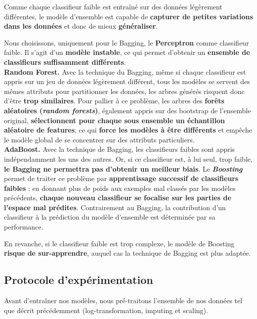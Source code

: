 \documentclass[12pt]{article}
\begin{document}
Comme chaque classifieur faible est entraîné sur des données légèrement
différentes, le modèle d'ensemble est capable de \textbf{capturer de petites
variations dans les données} et donc de mieux \textbf{généraliser}. 

Nous choisissons, uniquement pour le Bagging, le \textbf{Perceptron} comme
classifieur faible. Il s'agit d'un \textbf{modèle instable}, ce qui permet
d'obtenir un \textbf{ensemble de classifieurs suffisamment différents}. \\

\textbf{Random Forest. } \quad Avec la technique du Bagging, même si chaque classifieur
est appris sur un jeu de données légèrement différent, tous les modèles se servent des
mêmes attributs pour partitionner les données, les arbres générés
risquent donc d'être \textbf{trop similaires}. Pour pallier à ce problème, les
arbres des \textbf{forêts aléatoires (\emph{random forests})}, également appris
sur des bootstrap de l'ensemble original, \textbf{sélectionnent pour chaque sous ensemble
un échantillon aléatoire de features}, ce qui \textbf{force les modèles à être
différents} et empêche le modèle global de se concentrer sur des attributs particuliers. \\

\textbf{AdaBoost. } \quad Avec la technique de Bagging, les classifieurs faibles
sont appris indépendamment les uns des autres. Or, si ce classifieur est, à lui
seul, trop faible, \textbf{le Bagging ne permettra pas d'obtenir un meilleur
biais}. Le \textbf{\emph{Boosting}} permet de traiter ce problème par
\textbf{apprentissage successif de classifieurs faibles} : en donnant plus de
poids aux exemples mal classés par les modèles précédents, \textbf{chaque nouveau
classifieur se focalise sur les parties de l'espace mal prédites}. Contrairement
au Bagging, la contribution d'un classifieur à la prédiction du modèle
d'ensemble est déterminée par sa performance.

En revanche, si le classifieur faible est trop complexe, le modèle de Boosting
\textbf{risque de sur-apprendre}, auquel cas la technique de Bagging est plus
adaptée.\\

\subsection{Protocole d'expérimentation}


Avant d'entraîner nos modèles, nous pré-traitons l'ensemble de nos données tel que décrit
précédemment (log-transformation, imputing et scaling). \\
\end{document}
